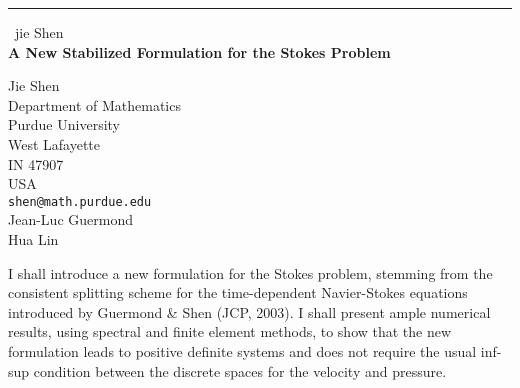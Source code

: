 \documentclass{report}
\begin{document}
\begin{center}
\rule{6in}{1pt} \
{\large jie Shen \\
{\bf A New Stabilized Formulation for the Stokes Problem }}

Jie Shen \\ Department of Mathematics \\ Purdue University \\ West Lafayette \\ IN 47907 \\ USA
\\
{\tt shen@math.purdue.edu}\\
Jean-Luc Guermond\\
Hua Lin\end{center}


I shall introduce a new formulation for the Stokes problem, stemming
from the consistent splitting scheme for the time-dependent
Navier-Stokes equations introduced by Guermond & Shen (JCP, 2003).
I shall present ample numerical results, using spectral and finite element
methods, to show that the new formulation leads to positive definite
systems and does not require the usual inf-sup condition between the
discrete spaces for the velocity and pressure.
\end{document}
